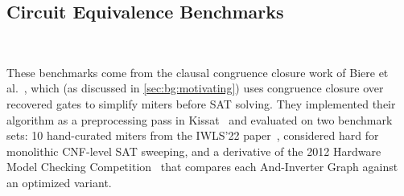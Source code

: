 



\subsection{Circuit Equivalence Benchmarks}~\label{sec:eval:circuit}






These benchmarks come from the clausal congruence closure work of Biere
et al.~\cite{clausal-cc}, which (as discussed in
\autoref{sec:bg:motivating}) uses congruence closure over recovered gates to simplify
miters before SAT solving. They implemented their algorithm as a
preprocessing pass in Kissat~\cite{kissat} and evaluated on two benchmark
sets: 10 hand-curated miters from the IWLS'22 paper~\cite{iwls},
considered hard for monolithic CNF-level SAT sweeping, and a derivative
of the 2012 Hardware Model Checking Competition~\cite{hwmcc} that
compares each And-Inverter Graph against an optimized variant.

